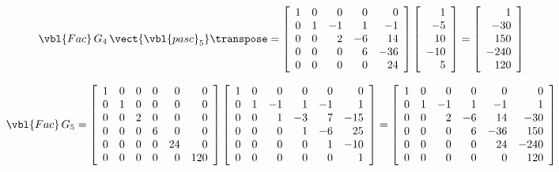 \[
 \vbl{Fac}\,G_4\,\vect{\vbl{pasc}_5}\transpose =
 \left[\begin{array}{rrrrr}
   1 & 0 &  0 &  0 &   0 \\
   0 & 1 & -1 &  1 &  -1 \\
   0 & 0 &  2 & -6 &  14 \\
   0 & 0 &  0 &  6 & -36 \\
   0 & 0 &  0 &  0 &  24 \\
 \end{array}\right]
 \left[\begin{array}{r}
   1 \\ -5 \\ 10 \\ -10 \\ 5 \\
 \end{array}\right]
 =
 \left[\begin{array}{r}
   1 \\ -30 \\ 150 \\ -240  \\ 120 \\
 \end{array}\right]
\]

\[
 \vbl{Fac}\,G_5 =
 \left[\begin{array}{rrrrrr}
   1 & 0 & 0 & 0 &  0 &   0 \\
   0 & 1 & 0 & 0 &  0 &   0 \\
   0 & 0 & 2 & 0 &  0 &   0 \\
   0 & 0 & 0 & 6 &  0 &   0 \\
   0 & 0 & 0 & 0 & 24 &   0 \\
   0 & 0 & 0 & 0 &  0 & 120 \\
 \end{array}\right]
 \left[\begin{array}{rrrrrr}
   1 & 0 &  0 &  0 &  0 &   0 \\
   0 & 1 & -1 &  1 & -1 &   1 \\
   0 & 0 &  1 & -3 &  7 & -15 \\
   0 & 0 &  0 &  1 & -6 &  25 \\
   0 & 0 &  0 &  0 &  1 & -10 \\
   0 & 0 &  0 &  0 &  0 &   1 \\
 \end{array}\right]
 =
 \left[\begin{array}{rrrrrr}
   1 & 0 &  0 &  0 &   0 &    0 \\
   0 & 1 & -1 &  1 &  -1 &    1 \\
   0 & 0 &  2 & -6 &  14 &  -30 \\
   0 & 0 &  0 &  6 & -36 &  150 \\
   0 & 0 &  0 &  0 &  24 & -240 \\
   0 & 0 &  0 &  0 &  0  &  120 \\
 \end{array}\right]
\]

